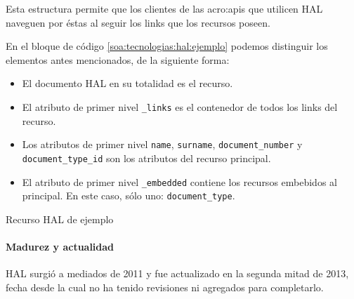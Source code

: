 Esta estructura permite que los clientes de las \glspl{acro:api} que utilicen HAL naveguen por éstas al seguir los links que los recursos poseen.

En el bloque de código \autoref{soa:tecnologias:hal:ejemplo} podemos distinguir los elementos antes mencionados, de la siguiente forma:

\begin{itemize}
  \item El documento HAL en su totalidad es el recurso.
  \item El atributo de primer nivel \verb|_links| es el contenedor de todos los links del recurso.
  \item Los atributos de primer nivel \texttt{name}, \texttt{surname}, \verb|document_number| y \verb|document_type_id| son los atributos del recurso principal.
  \item El atributo de primer nivel \verb|_embedded| contiene los recursos embebidos al principal. En este caso, sólo uno: \verb|document_type|.

\end{itemize}

\begin{listing}
  \caption{Recurso HAL de ejemplo}
  \label{soa:tecnologias:hal:ejemplo}
\end{listing}

\paragraph{Madurez y actualidad}

HAL surgió a mediados de 2011 y fue actualizado en la segunda mitad de 2013, fecha desde la cual no ha tenido revisiones ni agregados para completarlo.
